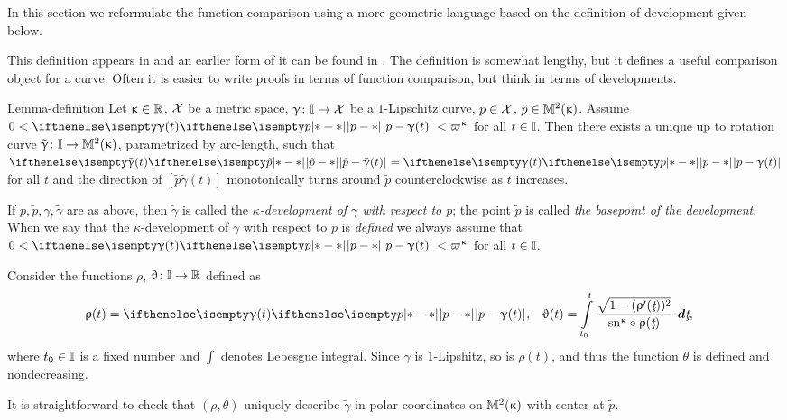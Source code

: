 In this section we reformulate the function comparison using a more geometric language based on the definition of development given below.

This definition appears in \cite{alexandrov:devel}
and an earlier form of it can be found in \cite{liberman}.
The definition is somewhat lengthy, but it defines a useful comparison object for a curve. 
Often it is easier to write proofs in terms of function comparison,
but think in terms of developments.

\begin{thm}{Lemma-definition}\label{lem:devel}\label{def:devel}
Let $\kappa\in \RR$, 
$\mathcal{X}$ be a metric space, 
$\gamma\:\II\to \spc{X}$ be a $1$-Lipschitz curve,
$p\in \spc{X}$,
$\tilde p\in\Lob2{\kappa}$.
Assume $0<\dist{p}{\gamma(t)}{} < \varpi\kappa$ for
all $t\in \II$.
Then there exists a unique up to rotation curve
$\tilde \gamma\: \II\to \Lob2\kappa$, parametrized by arc-length, 
such that
$\dist{\tilde p}{\tilde \gamma(t)}{}\z=\dist{p}{\gamma(t)}{}$ for all $t$
and the direction of
$[\tilde p\tilde \gamma(t)]$ monotonically turns around $\tilde p$ counterclockwise as $t$ increases.

\smallskip

If $p,\tilde p,\gamma,\tilde \gamma$ are as above,
then $\tilde \gamma$ is called the \emph{$\kappa$-development of $\gamma$
with respect to $p$}; 
the point $\tilde p$ is called \emph{the basepoint of the development}.
When we say that the $\kappa$-development of $\gamma$ with respect to $p$ is {}\emph{defined} we always assume that $0<\dist{p}{\gamma(t)}{} < \varpi\kappa$ for
all 
$t\in \II$.
\end{thm}

Consider the functions $\rho$, $\theta\:\II\to\RR$ defined as 
\begin{align*}
\rho(t)
&=\dist{p}{\gamma(t)}{},
&
\theta(t)
&=
\int\limits_{t_0}^{t}
\frac{\sqrt{1-(\rho'(\under{t}))^2}}{\sn\kappa\circ\rho(\under{t})}\cdot\dd\under{t},
\end{align*}
where $t_0\in\II$ is a fixed number and $\int$  denotes Lebesgue integral.
Since $\gamma$ is $1$-Lipshitz, so is $\rho(t)$, and thus the function $\theta$ is defined and nondecreasing.

It is straightforward to check that $(\rho,\theta)$ uniquely describe $\tilde \gamma$ in polar coordinates on $\mathbb{M}_{{}}^{2}({\upkappa})$ with center at $\tilde p$.
\qeds


